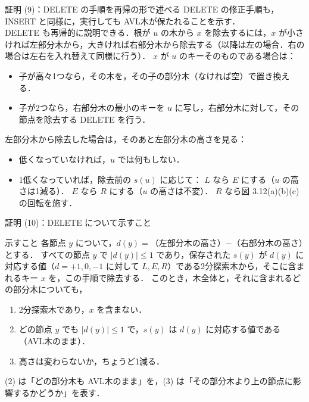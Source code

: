 \documentclass[aspectratio=169,11pt]{beamer}
\begin{document}
\begin{frame}{証明 (9)：DELETE の手順を再帰の形で述べる}
  \footnotesize
  DELETE の修正手順も，INSERT と同様に，実行しても AVL木が保たれることを示す．\\[2pt]
  DELETE も再帰的に説明できる．根が $u$ の木から $x$ を除去するには，$x$ が小さければ左部分木から，大きければ右部分木から除去する（以降は左の場合．右の場合は左右を入れ替えて同様に行う）．
  $x$ が $u$ のキーそのものである場合は：
  \begin{itemize}
    \item 子が高々1つなら，その木を，その子の部分木（なければ空）で置き換える．
    \item 子が2つなら，右部分木の最小のキーを $u$ に写し，右部分木に対して，その節点を除去する DELETE を行う．
  \end{itemize}
  左部分木から除去した場合は，そのあと左部分木の高さを見る：
  \begin{itemize}
    \item 低くなっていなければ，$u$ では何もしない．
    \item 1低くなっていれば，除去前の $s(u)$ に応じて：
      $L$ なら $E$ にする（$u$ の高さは1減る）．
      $E$ なら $R$ にする（$u$ の高さは不変）．
      $R$ なら図 3.12(a)(b)(c) の回転を施す．
  \end{itemize}
  \vspace{-4pt}
\end{frame}

\begin{frame}{証明 (10)：DELETE について示すこと}
  \footnotesize
  \begin{alertblock}{示すこと}
    各節点 $y$ について，$d(y)=$（左部分木の高さ）$-$（右部分木の高さ）とする．
    すべての節点 $y$ で $|d(y)|\le1$ であり，保存された $s(y)$ が $d(y)$ に対応する値（$d=+1,0,-1$ に対して $L,E,R$）である2分探索木から，そこに含まれるキー $x$ を，この手順で除去する．
    このとき，木全体と，それに含まれる\alert{どの部分木}についても，
    \begin{enumerate}[(1)]
      \item 2分探索木であり，$x$ を含まない．
      \item どの節点 $y$ でも $|d(y)|\le1$ で，$s(y)$ は $d(y)$ に対応する値である（\alert{AVL木のまま}）．
      \item 高さは変わらないか，ちょうど1減る．
    \end{enumerate}
  \end{alertblock}
  \vspace{4pt}
  (2) は「どの部分木も AVL木のまま」を，(3) は「その部分木より上の節点に影響するかどうか」を表す．
\end{frame}
\end{document}
